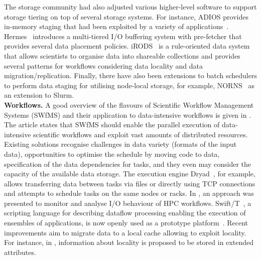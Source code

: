 \documentclass{superfri}
\begin{document}
The storage community had also adjusted various higher-level software to support storage tiering on top of several storage systems. For instance, ADIOS provides in-memory staging that had been exploited by a variety of applications~\cite{slawinska2013maya}.
Hermes~\cite{kougkas2020acceleration} introduces a multi-tiered I/O buffering system with pre-fetcher that provides several data placement policies.
iRODS~\cite{rajasekar2010irods} is a rule-oriented data system that allows scientists to organise data into shareable collections and provides several patterns for workflows considering data locality and data migration/replication.
Finally, there have also been extensions to batch schedulers to perform data staging for utilising node-local storage, for example, NORNS~\cite{miranda2019norns} as an extension to Slurm.\\

\textbf{Workflows.}
A good overview of the flavours of Scientific Workflow Management Systems (SWfMS) and their application to data-intensive workflows is given in \cite{liu2015survey}.
The article states that SWfMS should enable the parallel execution of data-intensive scientific workflows and exploit vast amounts of distributed resources.
Existing solutions recognise challenges in data variety (formats of the input data), opportunities to optimise the schedule by moving code to data, specification of the data dependencies for tasks, and they even may consider the capacity of the available data storage.
The execution engine Dryad~\cite{isard2007dryad}, for example, allows transferring data between tasks via files or directly using TCP connections and attempts to schedule tasks on the same nodes or racks.
In \cite{TUIBIHWLSC19}, an approach was presented to monitor and analyse I/O behaviour of HPC workflows.
Swift/T~\cite{6546066}, a scripting language for describing dataflow processing enabling the execution of ensembles of applications, is now openly used as a prototype platform~\cite{ozik2016desktop}.
Recent improvements aim to migrate data to a local cache allowing to exploit locality.
For instance, in \cite{dai2018cross}, information about locality is proposed to be stored in extended attributes.
\end{document}
